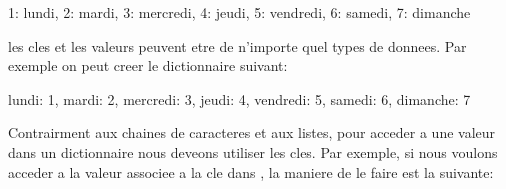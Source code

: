 \documentclass[letterpaper,10pt,french]{sphinxmanual}
\begin{document}
\begin{sphinxVerbatim}[commandchars=\\\{\}]
\PYGZob{}1: \PYGZsq{}lundi\PYGZsq{}, 2: \PYGZsq{}mardi\PYGZsq{}, 3: \PYGZsq{}mercredi\PYGZsq{}, 4: \PYGZsq{}jeudi\PYGZsq{}, 5: \PYGZsq{}vendredi\PYGZsq{}, 6: \PYGZsq{}samedi\PYGZsq{}, 7: \PYGZsq{}dimanche\PYGZsq{}\PYGZcb{}
\end{sphinxVerbatim}

\sphinxAtStartPar
les cles et les valeurs peuvent etre de n’importe quel types de donnees. Par exemple on peut creer le dictionnaire suivant:

\begin{sphinxVerbatim}[commandchars=\\\{\}]
  

\PYG{p}{[}\PYG{p}{]}  
\PYG{p}{[}\PYG{p}{]}  
\PYG{p}{[}\PYG{p}{]}  
\PYG{p}{[}\PYG{p}{]}  
\PYG{p}{[}\PYG{p}{]}  
\PYG{p}{[}\PYG{p}{]}  
\PYG{p}{[}\PYG{p}{]}  

\end{sphinxVerbatim}

\begin{sphinxVerbatim}[commandchars=\\\{\}]
\PYGZob{}\PYGZsq{}lundi\PYGZsq{}: 1, \PYGZsq{}mardi\PYGZsq{}: 2, \PYGZsq{}mercredi\PYGZsq{}: 3, \PYGZsq{}jeudi\PYGZsq{}: 4, \PYGZsq{}vendredi\PYGZsq{}: 5, \PYGZsq{}samedi\PYGZsq{}: 6, \PYGZsq{}dimanche\PYGZsq{}: 7\PYGZcb{}
\end{sphinxVerbatim}

\sphinxAtStartPar
Contrairment aux chaines de caracteres et aux listes, pour acceder a une valeur dans un dictionnaire nous deveons utiliser les cles. Par exemple, si nous voulons acceder a la valeur associee a la cle  dans , la maniere de le faire est la suivante:
\end{document}
